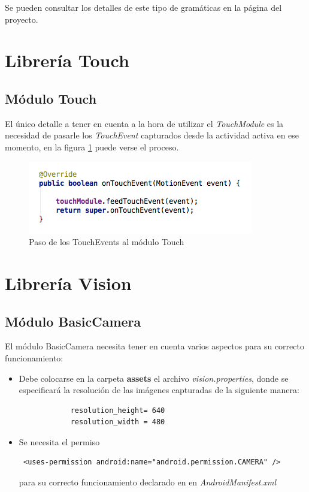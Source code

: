 Se pueden consultar los detalles de este tipo de gramáticas en la página del proyecto\cite{JSFGGrammar}.

\label{manual:speechrecognition}

\section{Librería Touch}
\subsection{Módulo Touch}
\label{manual:touchmodule}

El único detalle a tener en cuenta a la hora de utilizar el \textit{TouchModule} es la necesidad de pasarle los \textit{TouchEvent} capturados desde la actividad activa en ese momento, en la figura \ref{fig:feed-touchevent} puede verse el proceso.

\begin{figure}
	\centering
	\includegraphics[width=0.7\linewidth]{imagenes/feedingtouchevent.png}
	\caption{Paso de los TouchEvents al módulo Touch}
	\label{fig:feed-touchevent}
\end{figure}

\section{Librería Vision}
\subsection{Módulo BasicCamera}
\label{manual:basiccamera}
El módulo BasicCamera necesita tener en cuenta varios aspectos para su correcto funcionamiento:
	\begin{itemize}
		\item Debe colocarse en la carpeta \textbf{assets} el archivo \textit{vision.properties}, donde se especificará la resolución de las imágenes capturadas de la siguiente manera:
		\begin{verbatim}
			resolution_height= 640
			resolution_width = 480
		\end{verbatim}
		\item Se necesita el permiso \begin{verbatim} <uses-permission android:name="android.permission.CAMERA" />\end{verbatim} para su correcto funcionamiento declarado en en \textit{AndroidManifest.xml}
	\end{itemize}
	
